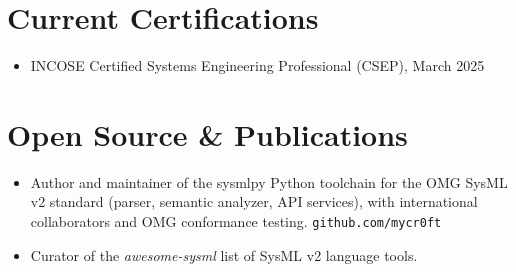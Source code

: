 \documentclass[american]{cv}
\begin{document}
\section{Current Certifications}

\begin{itemize}
\item INCOSE Certified Systems Engineering Professional (CSEP), March 2025
\end{itemize}

\section{Open Source \& Publications}

\begin{itemize}
\item Author and maintainer of the sysmlpy Python toolchain for the OMG SysML
v2 standard (parser, semantic analyzer, API services), with international
collaborators and OMG conformance testing. \texttt{github.com/mycr0ft}
\item Curator of the \emph{awesome-sysml} list of SysML v2 language tools.
\end{itemize}
\end{document}
